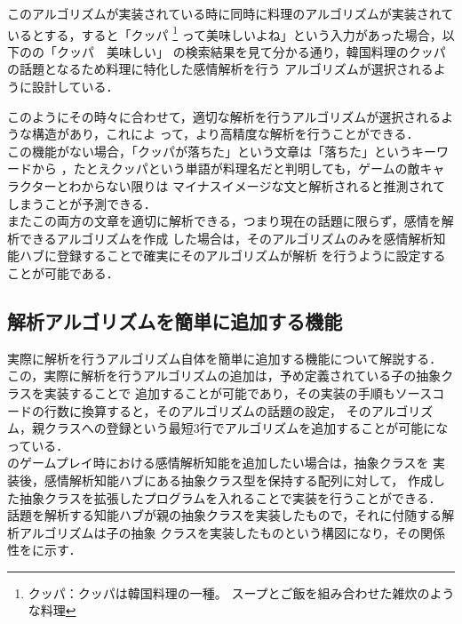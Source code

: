 このアルゴリズムが実装されている時に同時に料理のアルゴリズムが実装されているとする，すると「クッパ
	\footnote{クッパ：クッパは韓国料理の一種。 スープとご飯を組み合わせた雑炊のような料理}
って美味しいよね」という入力があった場合，以下のの「クッパ　美味しい」
の検索結果を見て分かる通り，韓国料理のクッパの話題となるため料理に特化した感情解析を行う
アルゴリズムが選択されるように設計している．


このようにその時々に合わせて，適切な解析を行うアルゴリズムが選択されるような構造があり，これによ
って，より高精度な解析を行うことができる．
\\
この機能がない場合，「クッパが落ちた」という文章は「落ちた」というキーワードから
，たとえクッパという単語が料理名だと判明しても，ゲームの敵キャラクターとわからない限りは
マイナスイメージな文と解析されると推測されてしまうことが予測できる．
\\
またこの両方の文章を適切に解析できる，つまり現在の話題に限らず，感情を解析できるアルゴリズムを作成
した場合は，そのアルゴリズムのみを感情解析知能ハブに登録することで確実にそのアルゴリズムが解析
を行うように設定することが可能である．
\newpage


\subsection{解析アルゴリズムを簡単に追加する機能}
実際に解析を行うアルゴリズム自体を簡単に追加する機能について解説する．
\\
この，実際に解析を行うアルゴリズムの追加は，予め定義されている子の抽象クラスを実装することで
追加することが可能であり，その実装の手順もソースコードの行数に換算すると，そのアルゴリズムの話題の設定，
そのアルゴリズム，親クラスへの登録という最短3行でアルゴリズムを追加することが可能になっている．\\

のゲームプレイ時における感情解析知能を追加したい場合は，抽象クラスを
実装後，感情解析知能ハブにある抽象クラス型を保持する配列に対して，
作成した抽象クラスを拡張したプログラムを入れることで実装を行うことができる．
\\
話題を解析する知能ハブが親の抽象クラスを実装したもので，それに付随する解析アルゴリズムは子の抽象
クラスを実装したものという構図になり，その関係性をに示す．


